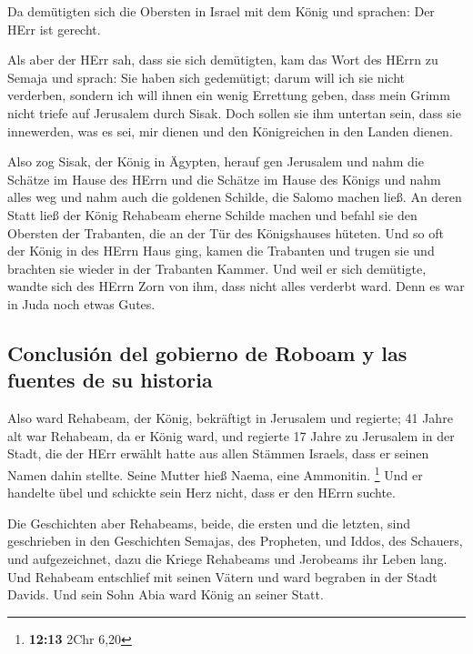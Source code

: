  Da demütigten sich die Obersten in Israel mit dem König
und sprachen: Der HErr ist gerecht.

 Als aber der HErr sah, dass sie sich demütigten, kam das
Wort des HErrn zu Semaja und sprach: Sie haben sich gedemütigt; darum
will ich sie nicht verderben, sondern ich will ihnen ein wenig Errettung
geben, dass mein Grimm nicht triefe auf Jerusalem durch Sisak.
 Doch sollen sie ihm untertan sein, dass sie innewerden,
was es sei, mir dienen und den Königreichen in den Landen dienen.

 Also zog Sisak, der König in Ägypten, herauf gen
Jerusalem und nahm die Schätze im Hause des HErrn und die Schätze im
Hause des Königs und nahm alles weg und nahm auch die goldenen Schilde,
die Salomo machen ließ.  An deren Statt ließ der König
Rehabeam eherne Schilde machen und befahl sie den Obersten der
Trabanten, die an der Tür des Königshauses hüteten.  Und
so oft der König in des HErrn Haus ging, kamen die Trabanten und trugen
sie und brachten sie wieder in der Trabanten Kammer.  Und
weil er sich demütigte, wandte sich des HErrn Zorn von ihm, dass nicht
alles verderbt ward. Denn es war in Juda noch etwas Gutes.

\hypertarget{conclusiuxf3n-del-gobierno-de-roboam-y-las-fuentes-de-su-historia}{%
\subsection{Conclusión del gobierno de Roboam y las fuentes de su
historia}\label{conclusiuxf3n-del-gobierno-de-roboam-y-las-fuentes-de-su-historia}}

 Also ward Rehabeam, der König, bekräftigt in Jerusalem
und regierte; 41 Jahre alt war Rehabeam, da er König ward, und regierte
17 Jahre zu Jerusalem in der Stadt, die der HErr erwählt hatte aus allen
Stämmen Israels, dass er seinen Namen dahin stellte. Seine Mutter hieß
Naema, eine Ammonitin. \footnote{\textbf{12:13} 2Chr 6,20}
 Und er handelte übel und schickte sein Herz nicht, dass
er den HErrn suchte.

 Die Geschichten aber Rehabeams, beide, die ersten und
die letzten, sind geschrieben in den Geschichten Semajas, des Propheten,
und Iddos, des Schauers, und aufgezeichnet, dazu die Kriege Rehabeams
und Jerobeams ihr Leben lang.  Und Rehabeam entschlief
mit seinen Vätern und ward begraben in der Stadt Davids. Und sein Sohn
Abia ward König an seiner Statt.

